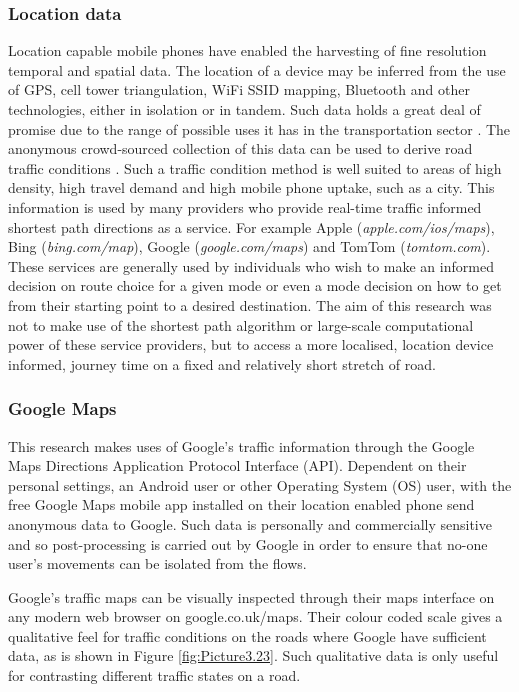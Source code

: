 \documentclass{CUP-JNL-DCE}
\begin{document}
\subsubsection{Location data}

Location capable mobile phones have enabled the harvesting of fine resolution temporal and spatial data. The location of a device may be inferred from the use of GPS, cell tower triangulation, WiFi SSID mapping, Bluetooth and other technologies, either in isolation or in tandem. Such data holds a great deal of promise due to the range of possible uses it has in the transportation sector \citep{zheng2010understanding}. The anonymous crowd-sourced collection of this data can be used to derive road traffic conditions \citep{google_traffic_blog}. Such a traffic condition method is well suited to areas of high density, high travel demand and high mobile phone uptake, such as a city. This information is used by many providers who provide real-time traffic informed shortest path directions as a service. For example Apple (\textit{apple.com/ios/maps}), Bing (\textit{bing.com/map}), Google (\textit{google.com/maps}) and TomTom (\textit{tomtom.com}). These services are generally used by individuals who wish to make an informed decision on route choice for a given mode or even a mode decision on how to get from their starting point to a desired destination. The aim of this research was not to make use of the shortest path algorithm or large-scale computational power of these service providers, but to access a more localised, location device informed, journey time on a fixed and relatively short stretch of road. 

\subsubsection{Google Maps}

This research makes uses of Google's traffic information through the Google Maps Directions \citep{Google_directions_api} Application Protocol Interface (API). Dependent on their personal settings, an Android user or other Operating System (OS) user, with the free Google Maps mobile app installed on their location enabled phone send anonymous data to Google. Such data is personally and commercially sensitive and so post-processing is carried out by Google in order to ensure that no-one user's movements can be isolated from the flows.  

Google's traffic maps can be visually inspected through their maps interface on any modern web browser on google.co.uk/maps. Their colour coded scale gives a qualitative feel for traffic conditions on the roads where Google have sufficient data, as is shown in Figure \ref{fig:Picture3.23}. Such qualitative data is only useful for contrasting different traffic states on a road. 
\end{document}
